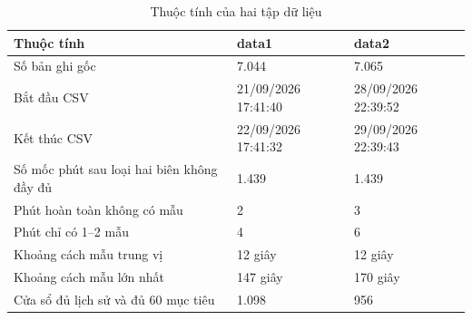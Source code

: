 \begin{table}[htbp]
        \centering
        \caption{Thuộc tính của hai tập dữ liệu}
        \vspace{0.2cm}
        \begin{tabular}{|p{7cm}|p{4cm}|p{4cm}|}
            \hline
            \textbf{Thuộc tính} & \textbf{data1} & \textbf{data2} \\
            \hline
            Số bản ghi gốc & 7.044 & 7.065 \\
            \hline
            Bắt đầu CSV & 21/09/2026 17:41:40 & 28/09/2026 22:39:52 \\
            \hline
            Kết thúc CSV & 22/09/2026 17:41:32 & 29/09/2026 22:39:43 \\
            \hline
            Số mốc phút sau loại hai biên không đầy đủ & 1.439 & 1.439 \\
            \hline
            Phút hoàn toàn không có mẫu & 2 & 3 \\
            \hline
            Phút chỉ có 1–2 mẫu & 4 & 6 \\
            \hline
            Khoảng cách mẫu trung vị & 12 giây & 12 giây \\
            \hline
            Khoảng cách mẫu lớn nhất & 147 giây & 170 giây \\
            \hline
            Cửa sổ đủ lịch sử và đủ 60 mục tiêu & 1.098 & 956 \\
            \hline
        \end{tabular}
    \end{table}